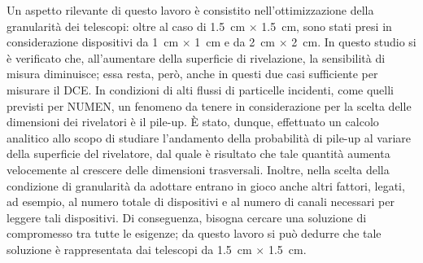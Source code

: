 Un aspetto rilevante di questo lavoro è consistito nell'ottimizzazione della granularità dei telescopi: oltre al caso di 1.5~cm $\times$ 1.5~cm, sono stati presi in considerazione dispositivi da 1~cm $\times$ 1~cm e da 2~cm $\times$ 2~cm.
In questo studio si è verificato che, all'aumentare della superficie di rivelazione, la sensibilità di misura diminuisce; essa resta, però, anche in questi due casi sufficiente per misurare il DCE.
In condizioni di alti flussi di particelle incidenti, come quelli previsti per NUMEN, un fenomeno da tenere in considerazione per la scelta delle dimensioni dei rivelatori è il pile-up.
È stato, dunque, effettuato un calcolo analitico allo scopo di studiare l'andamento della probabilità di pile-up al variare della superficie del rivelatore, dal quale è risultato che tale quantità aumenta velocemente al crescere delle dimensioni trasversali.
Inoltre, nella scelta della condizione di granularità da adottare entrano in gioco anche altri fattori, legati, ad esempio, al numero totale di dispositivi e al numero di canali necessari per leggere tali dispositivi.
Di conseguenza, bisogna cercare una soluzione di compromesso tra tutte le esigenze; da questo lavoro si può dedurre che tale soluzione è rappresentata dai telescopi da 1.5~cm $\times$ 1.5~cm.






